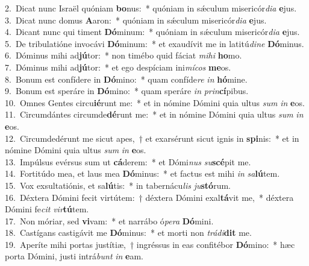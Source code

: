 {2.~}Dicat nunc Israël quóniam \textbf{bo}nus:~* quóniam in sǽculum misericór\textit{di}\textit{a} \textbf{e}jus.\\
{3.~}Dicat nunc domus \textbf{A}aron:~* quóniam in sǽculum misericór\textit{di}\textit{a} \textbf{e}jus.\\
{4.~}Dicant nunc qui timent \textbf{Dó}minum:~* quóniam in sǽculum misericór\textit{di}\textit{a} \textbf{e}jus.\\
{5.~}De tribulatióne invocávi \textbf{Dó}minum:~* et exaudívit me in latitú\textit{di}\textit{ne} \textbf{Dó}minus.\\
{6.~}Dóminus mihi ad\textbf{jú}tor:~* non timébo quid fáciat \textit{mi}\textit{hi} \textbf{ho}mo.\\
{7.~}Dóminus mihi ad\textbf{jú}tor:~* et ego despíciam ini\textit{mí}\textit{cos} \textbf{me}os.\\
{8.~}Bonum est confídere in \textbf{Dó}mino:~* quam confíde\textit{re} \textit{in} \textbf{hó}mine.\\
{9.~}Bonum est speráre in \textbf{Dó}mino:~* quam speráre \textit{in} \textit{prin}\textbf{cí}pibus.\\
{10.~}Omnes Gentes circu\textbf{ié}runt me:~* et in nómine Dómini quia ultus \textit{sum} \textit{in} \textbf{e}os.\\
{11.~}Circumdántes circumde\textbf{dé}runt me:~* et in nómine Dómini quia ultus \textit{sum} \textit{in} \textbf{e}os.\\
{12.~}Circumdedérunt me sicut apes,~† et exarsérunt sicut ignis in \textbf{spi}nis:~* et in nómine Dómini quia ultus \textit{sum} \textit{in} \textbf{e}os.\\
{13.~}Impúlsus evérsus sum ut \textbf{cá}derem:~* et Dómi\textit{nus} \textit{su}\textbf{scé}pit me.\\
{14.~}Fortitúdo mea, et laus mea \textbf{Dó}minus:~* et factus est mihi \textit{in} \textit{sa}\textbf{lú}tem.\\
{15.~}Vox exsultatiónis, et sa\textbf{lú}tis:~* in tabernácu\textit{lis} \textit{ju}\textbf{stó}rum.\\
{16.~}Déxtera Dómini fecit virtútem:~† déxtera Dómini exal\textbf{tá}vit me,~* déxtera Dómini fe\textit{cit} \textit{vir}\textbf{tú}tem.\\
{17.~}Non móriar, sed \textbf{vi}vam:~* et narrábo ó\textit{pe}\textit{ra} \textbf{Dó}mini.\\
{18.~}Castígans castigávit me \textbf{Dó}minus:~* et morti non \textit{trá}\textit{di}\textbf{dit} me.\\
{19.~}Aperíte mihi portas justítiæ,~† ingréssus in eas confitébor \textbf{Dó}mino:~* hæc porta Dómini, justi intrá\textit{bunt} \textit{in} \textbf{e}am.\\
